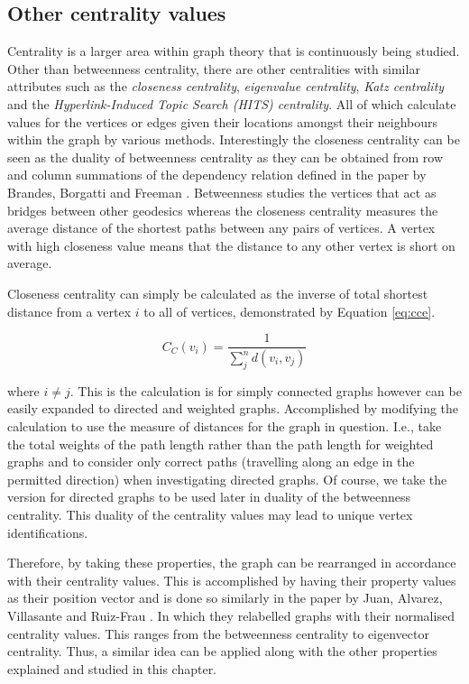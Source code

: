 \subsection{Other centrality values}
Centrality is a larger area within graph theory that is continuously being studied. Other than betweenness centrality, there are other centralities with similar attributes such as the \emph{closeness centrality}, \emph{eigenvalue centrality}, \emph{Katz centrality} \cite{katz1953new} and the \emph{Hyperlink-Induced Topic Search (HITS) centrality}. All of which calculate values for the vertices or edges given their locations amongst their neighbours within the graph by various methods. Interestingly the closeness centrality can be seen as the duality of betweenness centrality as they can be obtained from row and column summations of the dependency relation defined in the paper by Brandes, Borgatti and Freeman \cite{brandes2016maintaining}.
Betweenness studies the vertices that act as bridges between other geodesics whereas the closeness centrality measures the average distance of the shortest paths between any pairs of vertices. A vertex with high closeness value means that the distance to any other vertex is short on average. 

Closeness centrality \cite{brandes2007centrality} can simply be calculated as the inverse of total shortest distance from a vertex $i$ to all of vertices, demonstrated by Equation \ref{eq:cce}.

\begin{equation}\label{eq:cce}
C_C(v_i) = \frac{1}{\sum_{j}^nd(v_i, v_j)}
\end{equation}

where $i \ne j$. This is the calculation is for simply connected graphs however can be easily expanded to directed and weighted graphs. Accomplished by modifying the calculation to use the measure of distances for the graph in question. I.e., take the total weights of the path length rather than the path length for weighted graphs and to consider only correct paths (travelling along an edge in the permitted direction) when investigating directed graphs. Of course, we take the version for directed graphs to be used later in duality of the betweenness centrality. This duality of the centrality values may lead to unique vertex identifications.
\newline

Therefore, by taking these properties, the graph can be rearranged in accordance with their centrality values. This is accomplished by having their property values as their position vector and is done so similarly in the paper by Juan, Alvarez, Villasante and Ruiz-Frau \cite{de2021graph}. In which they relabelled graphs with their normalised centrality values. This ranges from the betweenness centrality to eigenvector centrality. Thus, a similar idea can be applied along with the other properties explained and studied in this chapter.

